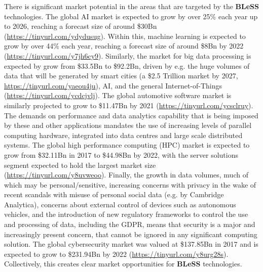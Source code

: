 \documentclass[a4paper,11pt]{article}
\newcommand{\project}[1]{\textbf{#1}\xspace}
\newcommand{\BLESS}{\project{BLeSS}}
\newcommand{\TheProject}{\BLESS}
\begin{document}
There is significant market potential in the areas that are targeted by the \TheProject{} technologies.
The global AI market is expected to grow by over 25\% each year up to 2026, reaching a forecast size of around \$30Bn (\url{https://tinyurl.com/ydydusug}).
Within this, machine learning is expected to grow by over 44\% each year, reaching a forecast size of around \$8Bn by 2022 (\url{https://tinyurl.com/y7jh6cy9}).
Similarly, the market for big data processing is expected by grow from \$33.5Bn to \$92.2Bn, driven by e.g. the
huge volumes of data that will be generated by smart cities (a \$2.5 Trillion market by 2027, \url{https://tinyurl.com/yaeou4ju}), 
AI, and the general Internet-of-Things (\url{https://tinyurl.com/ycdcjvlj}).
The global automotive software market is similarly projected to grow to \$11.47Bn by 2021 (\url{https://tinyurl.com/ycsclruy}).
The  demands on performance and data analytics capability that is being imposed by these and other applications mandates the use of 
increasing levels of parallel computing hardware, integrated into data centres and large scale distributed systems.
The global high performance computing (HPC) market is expected to grow from \$32.11Bn in 2017 to \$44.98Bn by 2022,
with the server solutions segment expected to hold the largest market size (\url{https://tinyurl.com/y8uvweoo}).
Finally, the  growth in data volumes, much of which may be personal/sensitive, increasing concerns with privacy in the wake
of recent scandals with misuse of personal social data (e.g. by Cambridge Analytica), concerns about external control of devices such as autonomous vehicles,
and the introduction of new regulatory frameworks to control the use
and processing of data, including the GDPR, means that security is a major and increasingly present concern,
that cannot be ignored in any significant computing solution.
The global cybersecurity market was valued at \$137.85Bn in 2017 and is expected to grow to \$231.94Bn by 2022 (\url{https://tinyurl.com/y8urg28s}).
Collectively, this creates clear market opportunities for \TheProject{} technologies.
\end{document}
